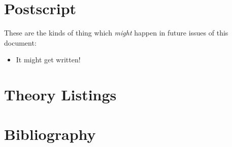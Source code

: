 
\section{Postscript}\label{POSTSCRIPT}

These are the kinds of thing which {\it might} happen in future issues of this document:

\begin{itemize}
\item It might get written!
\end{itemize}

\appendix

\vfill
\section{Theory Listings}
{
\let\Section\subsection
\let\Subsection\subsubsection
\def\subsection#1{\Subsection*{#1}}
\def\section#1{\Section{#1}\label{grice}}

\def\section#1{\Section{#1}\label{ghp1}}


}  %

\pagebreak

\section*{Bibliography}\label{BIBLIOGRAPHY}

{\def\section*#1{\ignore{#1}}
\raggedright


} %

{
{\small\printindex}}


